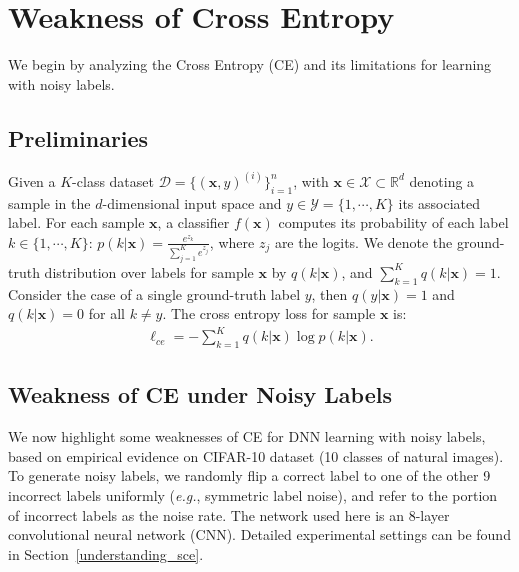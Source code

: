 \documentclass[10pt,twocolumn,letterpaper]{article}
\def \xx {\mathbf{x}}
\def \X  {\mathcal{X}}
\def \Y  {\mathcal{Y}}
\begin{document}
\section{Weakness of Cross Entropy}\label{sec:understanding}
We begin by analyzing the Cross Entropy (CE) and its limitations for learning with noisy labels.

\subsection{Preliminaries}
Given a $K$-class dataset $\mathcal{D} = \{(\xx, y)^{(i)}\}_{i=1}^n$, with $\xx \in \X \subset \mathbb{R}^d$ denoting a sample in the $d$-dimensional input space and $y \in \Y = \{1, \cdots, K\}$ its associated label. For each sample $\xx$, a classifier $f(\xx)$ computes its probability of each label $k \in \{1, \cdots, K\}$: $p(k|\xx) = \frac{e^{z_{k}}}{\sum_{j=1}^K e^{z_{j}}}$, where $z_j$ are the logits. We denote the ground-truth distribution over labels for sample $\xx$ by $q(k|\xx)$, and $\sum_{k=1}^{K}q(k|\xx)=1$. Consider the case of a single ground-truth label $y$, then $q(y|\xx)=1$ and $q(k|\xx)=0$ for all $k \neq y$. The cross entropy loss for sample $\xx$ is:
\vspace{-0.1 in}
\begin{equation}\label{eq:ce}
\begin{split}
    \ell_{ce} = -\sum_{k=1}^{K} q(k|\xx) \log p(k|\xx).
\end{split}
\end{equation}

\subsection{Weakness of CE under Noisy Labels}\label{drawback_ce}
We now highlight some weaknesses of CE for DNN learning with noisy labels, based on empirical evidence on CIFAR-10 dataset \cite{krizhevsky2009learning} (10 classes of natural images). To generate noisy labels, we randomly flip a correct label to one of the other 9 incorrect labels uniformly (\textit{e.g.}, symmetric label noise), and refer to the portion of incorrect labels as the noise rate. The network used here is an 8-layer convolutional neural network (CNN). Detailed experimental settings can be found in Section~\ref{understanding_sce}.
\end{document}
